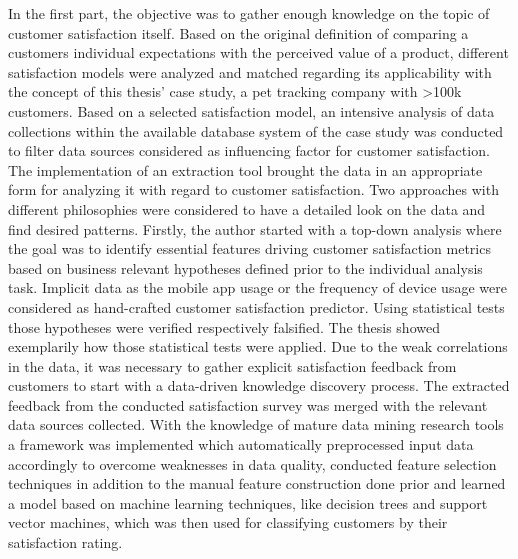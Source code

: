 In the first part, the objective was to gather enough knowledge on the topic of customer satisfaction itself. Based on the original definition of comparing a customers individual expectations with the perceived value of a product, different satisfaction models were analyzed and matched regarding its applicability with the concept of this thesis' case study, a pet tracking company with >100k customers. Based on a selected satisfaction model, an intensive analysis of data collections within the available database system of the case study was conducted to filter data sources considered as influencing factor for customer satisfaction. The implementation of an extraction tool brought the data in an appropriate form for analyzing it with regard to customer satisfaction. Two approaches with different philosophies were considered to have a detailed look on the data and find desired patterns. Firstly, the author started with a top-down analysis where the goal was to identify essential features driving customer satisfaction metrics based on business relevant hypotheses defined prior to the individual analysis task. Implicit data as the mobile app usage or the frequency of device usage were considered as hand-crafted customer satisfaction predictor. Using statistical tests those hypotheses were verified respectively falsified. The thesis showed exemplarily how those statistical tests were applied. Due to the weak correlations in the data, it was necessary to gather explicit satisfaction feedback from customers to start with a data-driven knowledge discovery process. The extracted feedback from the conducted satisfaction survey was merged with the relevant data sources collected. With the knowledge of mature data mining research tools a framework was implemented which automatically preprocessed input data accordingly to overcome weaknesses in data quality, conducted feature selection techniques in addition to the manual feature construction done prior and learned a model based on machine learning techniques, like decision trees and support vector machines, which was then used for classifying customers by their satisfaction rating. 


